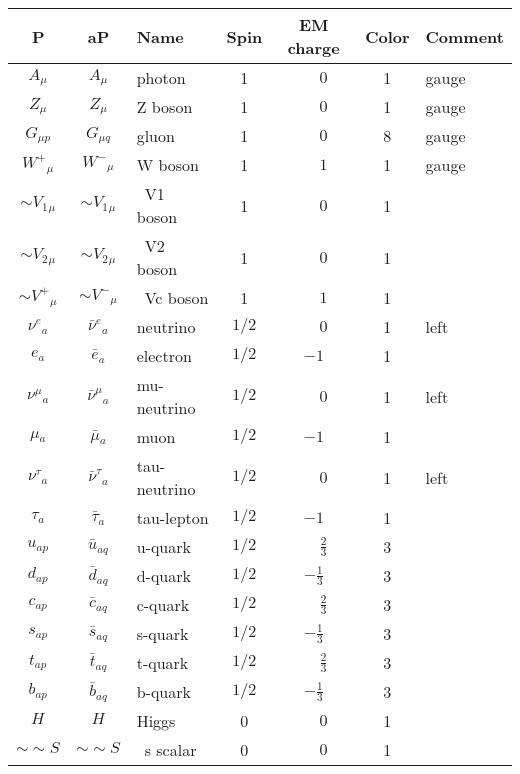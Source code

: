 \begin{tabular}{|cc|l|c|c|c|l|} \hline
P & aP & Name & Spin  & EM charge & Color & Comment \\ \hline
$A_{\mu }$&$A_{\mu }$&photon        &1           & $\phantom{-}0$ &1    &gauge\\
$Z_{\mu }$&$Z_{\mu }$&Z boson       &1           & $\phantom{-}0$ &1    &gauge\\
$G_{\mu p}$&$G_{\mu q}$&gluon         &1           & $\phantom{-}0$ &8    &gauge\\
$W^+{}_{\mu }$&$W^-{}_{\mu }$&W boson       &1           &$\phantom{-}1$ &1    &gauge\\
$\sim V_1{}_{\mu }$&$\sim V_1{}_{\mu }$&~V1 boson     &1           & $\phantom{-}0$ &1    &   \\
$\sim V_2{}_{\mu }$&$\sim V_2{}_{\mu }$&~V2 boson     &1           & $\phantom{-}0$ &1    &   \\
$\sim V^+{}_{\mu }$&$\sim V^-{}_{\mu }$&~Vc boson     &1           &$\phantom{-}1$ &1    &   \\
$\nu^e{}_{a}$&$\bar{\nu}^e{}_{a}$&neutrino      &$1/2$       & $\phantom{-}0$ &1    &left\\
$e{}_{a}$ &$\bar{e}{}_{a}$&electron      &$1/2$       &$-1$ &1    &   \\
$\nu^\mu{}_{a}$&$\bar{\nu}^\mu{}_{a}$&mu-neutrino   &$1/2$       & $\phantom{-}0$ &1    &left\\
$\mu{}_{a}$&$\bar{\mu}{}_{a}$&muon          &$1/2$       &$-1$ &1    &   \\
$\nu^\tau{}_{a}$&$\bar{\nu}^\tau{}_{a}$&tau-neutrino  &$1/2$       & $\phantom{-}0$ &1    &left\\
$\tau{}_{a}$&$\bar{\tau}{}_{a}$&tau-lepton    &$1/2$       &$-1$ &1    &   \\
$u{}_{ap}$&$\bar{u}{}_{aq}$&u-quark       &$1/2$       &$\phantom{-}\frac{2}{3}$ &3    &   \\
$d{}_{ap}$&$\bar{d}{}_{aq}$&d-quark       &$1/2$       &$-\frac{1}{3}$ &3    &   \\
$c{}_{ap}$&$\bar{c}{}_{aq}$&c-quark       &$1/2$       &$\phantom{-}\frac{2}{3}$ &3    &   \\
$s{}_{ap}$&$\bar{s}{}_{aq}$&s-quark       &$1/2$       &$-\frac{1}{3}$ &3    &   \\
$t{}_{ap}$&$\bar{t}{}_{aq}$&t-quark       &$1/2$       &$\phantom{-}\frac{2}{3}$ &3    &   \\
$b{}_{ap}$&$\bar{b}{}_{aq}$&b-quark       &$1/2$       &$-\frac{1}{3}$ &3    &   \\
$H_{}$    &$H_{}$    &Higgs         &0           & $\phantom{-}0$ &1    &   \\
$\sim\sim S{}_{}$&$\sim\sim S{}_{}$&~s scalar     &0           & $\phantom{-}0$ &1    &   \\ \hline
\end{tabular}
